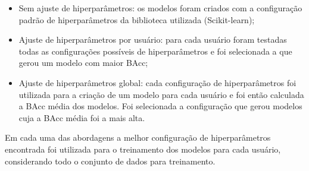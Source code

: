 \begin{itemize}
    \item Sem ajuste de hiperparâmetros: os modelos foram criados com a configuração padrão de hiperparâmetros da biblioteca utilizada (Scikit-learn);
    \item Ajuste de hiperparâmetros por usuário: para cada usuário foram testadas todas as configurações possíveis de hiperparâmetros e foi selecionada a que gerou um modelo com maior BAcc;
    \item Ajuste de hiperparâmetros global: cada configuração de hiperparâmetros foi utilizada para a criação de um modelo para cada usuário e foi então calculada a BAcc média dos modelos. Foi selecionada a configuração que gerou modelos cuja a BAcc média foi a mais alta. 
\end{itemize}

Em cada uma das abordagens a melhor configuração de hiperparâmetros encontrada foi utilizada para o treinamento dos modelos para cada usuário, considerando todo o conjunto de dados para treinamento.
